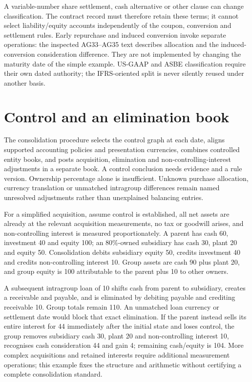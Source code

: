A variable-number share settlement, cash alternative or other clause can
change classification. The contract record must therefore retain these terms;
it cannot select liability/equity accounts independently of the coupon,
conversion and settlement rules. Early repurchase and induced conversion
invoke separate operations: the inspected AG33--AG35 text describes allocation
and the induced-conversion consideration difference. They are not implemented
by changing the maturity date of the simple example. US-GAAP and ASBE
classification require their own dated authority; the IFRS-oriented split is
never silently reused under another basis.

\section{Control and an elimination book}

The consolidation procedure selects the control graph at each date, aligns
supported accounting policies and presentation currencies, combines controlled
entity books, and posts acquisition, elimination and non-controlling-interest
adjustments in a separate book. A control conclusion needs evidence and a
rule version. Ownership percentage alone is insufficient. Unknown purchase
allocation, currency translation or unmatched intragroup differences remain
named unresolved adjustments rather than unexplained balancing entries.

For a simplified acquisition, assume control is established, all net assets
are already at the relevant acquisition measurements, no tax or goodwill
arises, and non-controlling interest is measured proportionately. A parent
has cash 60, investment 40 and equity 100; an 80\%-owned subsidiary has cash
30, plant 20 and equity 50. Consolidation debits subsidiary equity 50,
credits investment 40 and credits non-controlling interest 10. Group assets
are cash 90 plus plant 20, and group equity is 100 attributable to the parent
plus 10 to other owners.

A subsequent intragroup loan of 10 shifts cash from parent to subsidiary,
creates a receivable and payable, and is eliminated by debiting payable and
crediting receivable 10. Group totals remain 110. An unmatched loan currency
or settlement date would block that exact elimination. If the parent instead
sells its entire interest for 44 immediately after the initial state and
loses control, the group removes subsidiary cash 30, plant 20 and
non-controlling interest 10, recognises cash consideration 44 and gain 4;
remaining cash/equity is 104. More complex acquisitions and retained interests
require additional measurement operations; this example fixes the structure
and arithmetic without certifying a complete consolidation standard.

